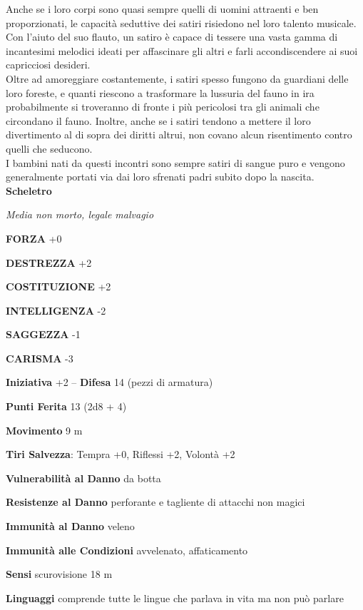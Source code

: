 \begin{multicols}{2}
Anche se i loro corpi sono quasi sempre quelli di uomini attraenti e ben proporzionati, le capacità seduttive dei satiri risiedono nel loro talento musicale. Con l'aiuto del suo flauto, un satiro è capace di tessere una vasta gamma di incantesimi melodici ideati per affascinare gli altri e farli accondiscendere ai suoi capricciosi desideri.\\

Oltre ad amoreggiare costantemente, i satiri spesso fungono da guardiani delle loro foreste, e quanti riescono a trasformare la lussuria del fauno in ira probabilmente si troveranno di fronte i più pericolosi tra gli animali che circondano il fauno. Inoltre, anche se i satiri tendono a mettere il loro divertimento al di sopra dei diritti altrui, non covano alcun risentimento contro quelli che seducono.\\

I bambini nati da questi incontri sono sempre satiri di sangue puro e vengono generalmente portati via dai loro sfrenati padri subito dopo la nascita.\\


\medskip{}\textbf{Scheletro}

\emph{Media non morto, legale malvagio}

\textbf{FORZA} +0

\textbf{DESTREZZA} +2

\textbf{COSTITUZIONE} +2

\textbf{INTELLIGENZA} -2

\textbf{SAGGEZZA} -1

\textbf{CARISMA} -3

\textbf{Iniziativa} +2 -- \textbf{Difesa} 14 (pezzi di armatura)

\textbf{Punti Ferita} 13 (2d8 + 4)

\textbf{Movimento} 9 m

\textbf{Tiri Salvezza}: Tempra +0, Riflessi +2, Volontà +2

\textbf{Vulnerabilità al Danno} da botta

\textbf{Resistenze al Danno} perforante e tagliente di attacchi non magici

\textbf{Immunità al Danno} veleno

\textbf{Immunità alle Condizioni} avvelenato, affaticamento

\textbf{Sensi} scurovisione 18 m

\textbf{Linguaggi} comprende tutte le lingue che parlava in vita ma non può parlare


\end{multicols}

